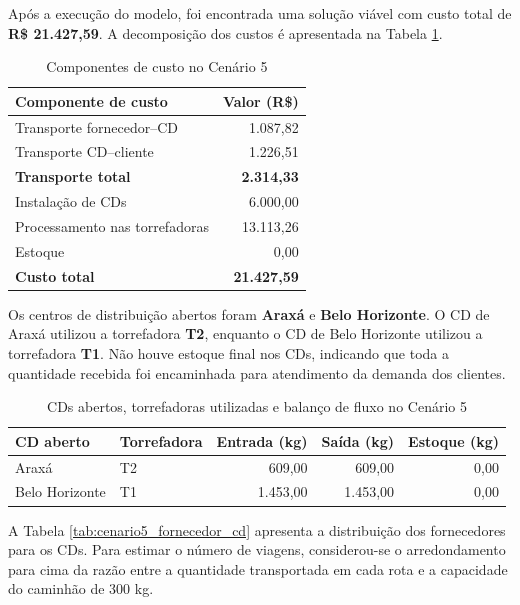\documentclass[a4paper,11pt]{article}
\begin{document}
Após a execução do modelo, foi encontrada uma solução viável com custo total de \textbf{R\$ 21.427,59}. A decomposição dos custos é apresentada na Tabela \ref{tab:cenario5_custos}.

\begin{table}[htbp]
\centering
\small
\begin{tabular}{lr}
\hline
\textbf{Componente de custo} & \textbf{Valor (R\$)} \\ \hline
Transporte fornecedor--CD & 1.087,82 \\
Transporte CD--cliente & 1.226,51 \\
\textbf{Transporte total} & \textbf{2.314,33} \\
Instalação de CDs & 6.000,00 \\
Processamento nas torrefadoras & 13.113,26 \\
Estoque & 0,00 \\ \hline
\textbf{Custo total} & \textbf{21.427,59} \\ \hline
\end{tabular}
\caption{Componentes de custo no Cenário 5}
\label{tab:cenario5_custos}
\end{table}

Os centros de distribuição abertos foram \textbf{Araxá} e \textbf{Belo Horizonte}. O CD de Araxá utilizou a torrefadora \textbf{T2}, enquanto o CD de Belo Horizonte utilizou a torrefadora \textbf{T1}. Não houve estoque final nos CDs, indicando que toda a quantidade recebida foi encaminhada para atendimento da demanda dos clientes.

\begin{table}[htbp]
\centering
\small
\begin{tabular}{llrrr}
\hline
\textbf{CD aberto} & \textbf{Torrefadora} & \textbf{Entrada (kg)} & \textbf{Saída (kg)} & \textbf{Estoque (kg)} \\ \hline
Araxá & T2 & 609,00 & 609,00 & 0,00 \\
Belo Horizonte & T1 & 1.453,00 & 1.453,00 & 0,00 \\ \hline
\end{tabular}
\caption{CDs abertos, torrefadoras utilizadas e balanço de fluxo no Cenário 5}
\label{tab:cenario5_cds}
\end{table}

A Tabela \ref{tab:cenario5_fornecedor_cd} apresenta a distribuição dos fornecedores para os CDs. Para estimar o número de viagens, considerou-se o arredondamento para cima da razão entre a quantidade transportada em cada rota e a capacidade do caminhão de 300 kg.
\end{document}
